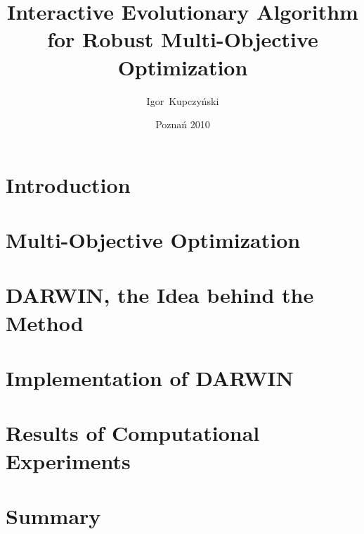 \documentclass[a4paper,english,thesis]{dcsbook}
\author{Igor~Kupczy\'nski}
\date{Pozna\'n 2010}
\title{Interactive Evolutionary Algorithm \\ for Robust Multi-Objective
  Optimization}
\begin{document}
\maketitle
\frontmatter
\tableofcontents{}
\mainmatter

\chapter{Introduction}

\chapter{Multi-Objective Optimization}


\chapter{DARWIN, the Idea behind the Method}
\label{darwin-the-idea}

\chapter{Implementation of DARWIN}
\label{darwin-implementation}


\chapter{Results of Computational Experiments}
\label{exp-results}


\chapter{Summary}


\backmatter



\appendix
\appendixpage
\addappheadtotoc

\end{document}

